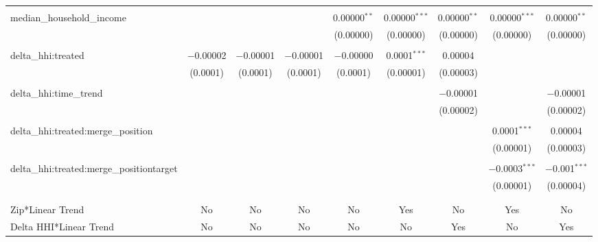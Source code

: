 \begin{table}[H]
{\begin{tabular}{@{\extracolsep{5pt}}lcccccccc}
   & & & & & & & & \\  

  median\_household\_income &  &  &  & 0.00000$^{**}$ & 0.00000$^{***}$ & 0.00000$^{**}$ & 0.00000$^{***}$ & 0.00000$^{**}$ \\  

   &  &  &  & (0.00000) & (0.00000) & (0.00000) & (0.00000) & (0.00000) \\  

   & & & & & & & & \\  

  delta\_hhi:treated & $-$0.00002 & $-$0.00001 & $-$0.00001 & $-$0.00000 & 0.0001$^{***}$ & 0.00004 &  &  \\  

   & (0.0001) & (0.0001) & (0.0001) & (0.0001) & (0.00001) & (0.00003) &  &  \\  

   & & & & & & & & \\  

  delta\_hhi:time\_trend &  &  &  &  &  & $-$0.00001 &  & $-$0.00001 \\  

   &  &  &  &  &  & (0.00002) &  & (0.00002) \\  

   & & & & & & & & \\  

  delta\_hhi:treated:merge\_position &  &  &  &  &  &  & 0.0001$^{***}$ & 0.00004 \\  

   &  &  &  &  &  &  & (0.00001) & (0.00003) \\  

   & & & & & & & & \\  

  delta\_hhi:treated:merge\_positiontarget &  &  &  &  &  &  & $-$0.0003$^{***}$ & $-$0.001$^{***}$ \\  

   &  &  &  &  &  &  & (0.00001) & (0.00004) \\  

   & & & & & & & & \\  

 \hline \\[-1.8ex]  

 Zip*Linear Trend & No & No & No & No & Yes & No & Yes & No \\  

 Delta HHI*Linear Trend & No & No & No & No & No & Yes & No & Yes \\  


\end{tabular}}
\end{table}
